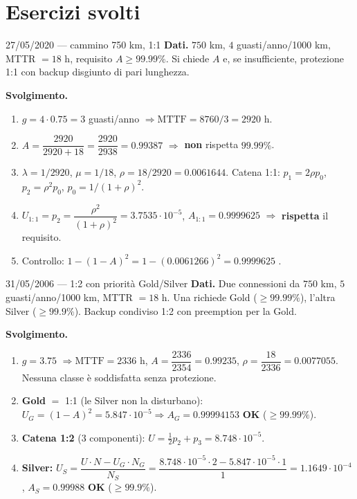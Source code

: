 \section{Esercizi svolti}

\begin{esempio}{27/05/2020 --- cammino 750 km, 1:1}
\textbf{Dati.} $750$ km, $4$ guasti/anno/1000 km, MTTR $=18$ h, requisito $A\ge99.99\%$. Si chiede $A$ e, se insufficiente, protezione 1:1 con backup disgiunto di pari lunghezza.

\textbf{Svolgimento.}
\begin{enumerate}[leftmargin=*,nosep]
\item $g=4\cdot0.75=3$ guasti/anno $\Rightarrow\mathrm{MTTF}=8760/3=2920$ h.
\item $A=\dfrac{2920}{2920+18}=\dfrac{2920}{2938}=0.99387$ $\Rightarrow$ \textbf{non} rispetta $99.99\%$.
\item $\lambda=1/2920$, $\mu=1/18$, $\rho=18/2920=0.0061644$. Catena 1:1: $p_1=2\rho p_0$, $p_2=\rho^2p_0$, $p_0=1/(1+\rho)^2$.
\item $U_{1:1}=p_2=\dfrac{\rho^2}{(1+\rho)^2}=3.7535\cdot10^{-5}$, $A_{1:1}=0.9999625$ $\Rightarrow$ \textbf{rispetta} il requisito.
\item Controllo: $1-(1-A)^2=1-(0.0061266)^2=0.9999625$ \checkmark.
\end{enumerate}
\end{esempio}

\begin{esempio}{31/05/2006 --- 1:2 con priorità Gold/Silver}
\textbf{Dati.} Due connessioni da $750$ km, $5$ guasti/anno/1000 km, MTTR $=18$ h. Una richiede Gold ($\ge99.99\%$), l'altra Silver ($\ge99.9\%$). Backup condiviso 1:2 con preemption per la Gold.

\textbf{Svolgimento.}
\begin{enumerate}[leftmargin=*,nosep]
\item $g=3.75$ $\Rightarrow\mathrm{MTTF}=2336$ h, $A=\dfrac{2336}{2354}=0.99235$, $\rho=\dfrac{18}{2336}=0.0077055$. Nessuna classe è soddisfatta senza protezione.
\item \textbf{Gold} $=$ 1:1 (le Silver non la disturbano): $U_G=(1-A)^2=5.847\cdot10^{-5}\Rightarrow A_G=0.99994153$ \textbf{OK} ($\ge99.99\%$).
\item \textbf{Catena 1:2} (3 componenti): $U=\tfrac12p_2+p_3=8.748\cdot10^{-5}$.
\item \textbf{Silver:} $U_S=\dfrac{U\cdot N-U_G\cdot N_G}{N_S}=\dfrac{8.748\cdot10^{-5}\cdot2-5.847\cdot10^{-5}\cdot1}{1}=1.1649\cdot10^{-4}$, $A_S=0.99988$ \textbf{OK} ($\ge99.9\%$).
\end{enumerate}
\end{esempio}

